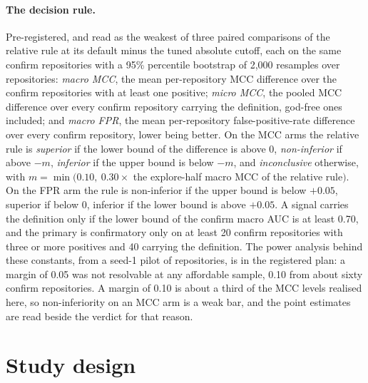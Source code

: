 \documentclass[11pt,a4paper]{article}
\begin{document}
\paragraph{The decision rule.} Pre-registered, and read as the weakest of
three paired comparisons of the relative rule at its default minus the tuned
absolute cutoff, each on the same confirm repositories with a 95\% percentile
bootstrap of 2{,}000 resamples over repositories: \emph{macro MCC}, the mean
per-repository MCC difference over the confirm repositories with at least one
positive; \emph{micro MCC}, the pooled MCC difference over every confirm
repository carrying the definition, god-free ones included; and \emph{macro
FPR}, the mean per-repository false-positive-rate difference over every
confirm repository, lower being better. On the MCC arms the relative rule is
\emph{superior} if the lower bound of the difference is above 0,
\emph{non-inferior} if above $-m$, \emph{inferior} if the upper bound is
below $-m$, and \emph{inconclusive} otherwise, with $m = \min(0.10,\ 0.30
\times$ the explore-half macro MCC of the relative rule$)$. On the FPR arm the
rule is non-inferior if the upper bound is below $+0.05$, superior if below 0,
inferior if the lower bound is above $+0.05$. A signal carries the definition
only if the lower bound of the confirm macro AUC is at least 0.70, and the
primary is confirmatory only on at least 20 confirm repositories with three or
more positives and 40 carrying the definition. The power analysis behind these
constants, from a seed-1 pilot of \nPilot{} repositories, is in the registered
plan: a margin of 0.05 was not resolvable at any affordable sample, 0.10 from
about sixty confirm repositories. A margin of 0.10 is about a third of the MCC
levels realised here, so non-inferiority on an MCC arm is a weak bar, and the
point estimates are read beside the verdict for that reason.

\section{Study design}
\label{sec:design}
\end{document}

